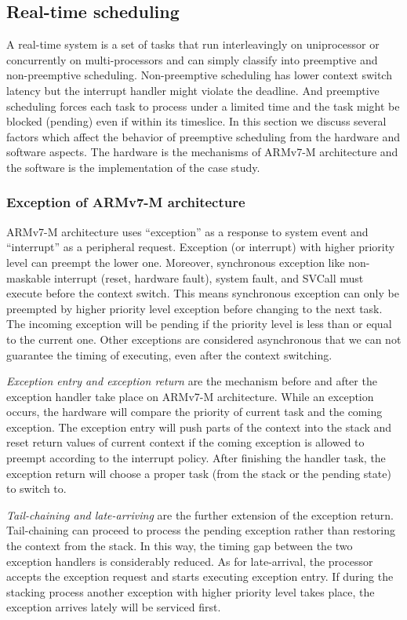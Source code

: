 \subsection{Real-time scheduling}
A real-time system is a set of tasks that run interleavingly on uniprocessor or concurrently on multi-processors and can simply classify into preemptive and non-preemptive scheduling. Non-preemptive scheduling has lower context switch latency but the interrupt handler might violate the deadline. And preemptive scheduling forces each task to process under a limited time and the task might be blocked (pending) even if within its timeslice. In this section we discuss several factors which affect the behavior of preemptive scheduling from the hardware and software aspects. The hardware is the mechanisms of ARMv7-M architecture and the software is the implementation of the case study.

\subsubsection{Exception of ARMv7-M architecture}
ARMv7-M architecture \cite{ARMv7-M:Manual, Yiu:2013:DGA:2602039} uses ``exception'' as a response to system event and ``interrupt'' as a peripheral request. Exception (or interrupt) with higher priority level can preempt the lower one. Moreover, synchronous exception like non-maskable interrupt (reset, hardware fault), system fault, and SVCall must execute before the context switch. This means synchronous exception can only be preempted by higher priority level exception before changing to the next task. The incoming exception will be pending if the priority level is less than or equal to the current one. Other exceptions are considered asynchronous that we can not guarantee the timing of executing, even after the context switching.

\textit{Exception entry and exception return} are the mechanism before and after the exception handler take place on ARMv7-M architecture. While an exception occurs, the hardware will compare the priority of current task and the coming exception. The exception entry will push parts of the context into the stack and reset return values of current context if the coming exception is allowed to preempt according to the interrupt policy. After finishing the handler task, the exception return will choose a proper task (from the stack or the pending state) to switch to.

\textit{Tail-chaining and late-arriving} are the further extension of the exception return. Tail-chaining can proceed to process the pending exception rather than restoring the context from the stack. In this way, the timing gap between the two exception handlers is considerably reduced. As for late-arrival, the processor accepts the exception request and starts executing exception entry. If during the stacking process another exception with higher priority level takes place, the exception arrives lately will be serviced first.

